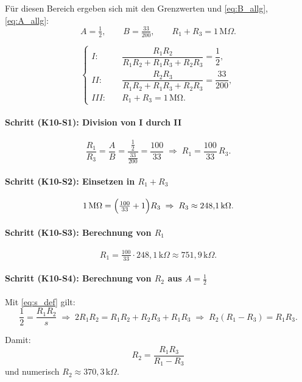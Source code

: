 \documentclass{article}
\begin{document}
	Für diesen Bereich ergeben sich mit den Grenzwerten und \eqref{eq:B_allg}, \eqref{eq:A_allg}:
	\[
	A=\tfrac{1}{2},\qquad
	B=\tfrac{33}{200},\qquad
	R_1+R_3=1\,\mathrm{M}\Omega.
	\]
	
	\[
	\left\{
	\begin{aligned}
		I: &\quad \dfrac{R_1R_2}{R_1R_2+R_1R_3+R_2R_3} = \dfrac{1}{2},\\[6pt]
		II:&\quad \dfrac{R_2R_3}{R_1R_2+R_1R_3+R_2R_3} = \dfrac{33}{200},\\[6pt]
		III:&\quad R_1 + R_3 = 1\,\mathrm{M\Omega}.
	\end{aligned}
	\right.
	\]
	
	\paragraph{Schritt (K10-S1): Division von I durch II}
	
	\[
	\frac{R_1}{R_3}=\frac{A}{B}
	=\frac{\tfrac12}{\tfrac{33}{200}}
	=\frac{100}{33}
	\;\Rightarrow\;
	R_1=\frac{100}{33}\,R_3.
	\]
	
	\paragraph{Schritt (K10-S2): Einsetzen in \(R_1+R_3\)}
	
	\[
	1\,\mathrm{M}\Omega=\Bigl(\tfrac{100}{33}+1\Bigr)R_3
	\;\Rightarrow\;
	R_3\approx 248{,}1\,\mathrm{k}\Omega.
	\]
	
	\paragraph{Schritt (K10-S3): Berechnung von \(R_1\)}
	
	\[
	R_1=\tfrac{100}{33}\cdot 248{,}1\,\mathrm{k}\Omega
	\approx 751{,}9\,\mathrm{k}\Omega.
	\]
	
	\paragraph{Schritt (K10-S4): Berechnung von \(R_2\) aus \(A=\tfrac12\)}
	
	Mit \eqref{eq:s_def} gilt:
	\[
	\frac{1}{2} = \frac{R_1 R_2}{s}
	\;\Rightarrow\;
	2R_1R_2=R_1R_2+R_2R_3+R_1R_3
	\;\Rightarrow\;
	R_2(R_1-R_3)=R_1R_3.
	\]
	
	Damit:
	\begin{equation}
		R_2=\frac{R_1R_3}{R_1-R_3}
		\label{eq:K10_R2}
	\end{equation}
	und numerisch \(R_2\approx 370{,}3\,\mathrm{k}\Omega\).
	
\end{document}
